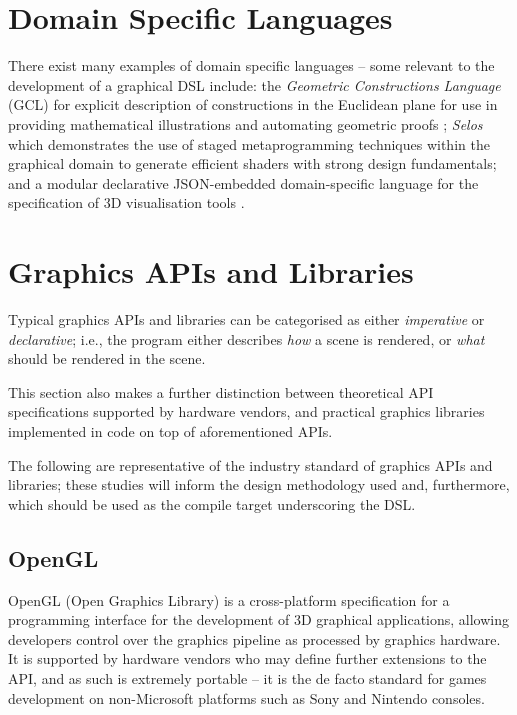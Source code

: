 \documentclass[12pt,twoside]{report}
\begin{document}
\section{Domain Specific Languages}

There exist many examples of domain specific languages -- some relevant to the development of a graphical DSL include: the \textit{Geometric Constructions Language} (GCL)\autocite{janicic_geometry_2010} for explicit description of constructions in the Euclidean plane for use in providing mathematical illustrations and automating geometric proofs ; \textit{Selos} \autocite{seitz_staged_2019} which demonstrates the use of staged metaprogramming techniques within the graphical domain to generate efficient shaders with strong design fundamentals; and a modular declarative JSON-embedded domain-specific language for the specification of 3D visualisation tools \autocite{scholz_modular_2021}.



\section{Graphics APIs and Libraries}

Typical graphics APIs and libraries can be categorised as either \textit{imperative} or \textit{declarative}; i.e., the program either describes \textit{how} a scene is rendered, or \textit{what} should be rendered in the scene. 

This section also makes a further distinction between theoretical API specifications supported by hardware vendors, and practical graphics libraries implemented in code on top of aforementioned APIs.

The following are representative of the industry standard of graphics APIs and libraries; these studies will inform the design methodology used and, furthermore, which should be used as the compile target underscoring the DSL.


\subsection{OpenGL}

OpenGL (Open Graphics Library) is a cross-platform specification for a programming interface for the development of 3D graphical applications, allowing developers control over the graphics pipeline as processed by graphics hardware. It is supported by hardware vendors who may define further extensions to the API, and as such is extremely portable -- it is the de facto standard for games development on non-Microsoft platforms such as Sony and Nintendo consoles.\autocite{jr_richard_s_wright_opengl_2010}
\end{document}
